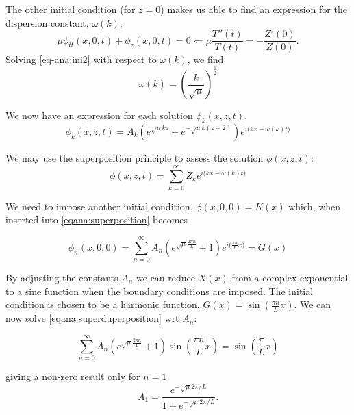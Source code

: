 \documentclass[11pt]{article}
\begin{document}
The other initial condition (for $z=0$) makes us able to find an expression for the dispersion constant, $\omega(k)$,
\begin{equation}
\mu \phi_{tt}(x,0,t) + \phi_{z}(x,0,t) = 0 \Longleftarrow \mu \frac{T''(t)}{T(t)} = - \frac{Z'(0)}{Z(0)}.
\label{eq-ana:ini2}
\end{equation}
Solving \eqref{eq-ana:ini2} with respect to $\omega(k)$, we find
\begin{equation*}
\omega(k) = \left( \frac{k}{\sqrt{\mu}} \right)^{\frac{1}{2}}
\end{equation*}

We now have an expression for each solution $\phi_k(x,z,t)$,
\begin{equation*}
\phi_k(x,z,t) = A_k \left( e^{\sqrt{\mu}kz} + e^{-\sqrt{\mu}k(z+2)} \right) e^{i\big( kx - \omega(k)t \big)}
\end{equation*}

We may use the superposition principle to assess the solution $\phi(x,z,t)$:
\begin{equation}
\label{eqana:superposition}
\phi(x,z,t) = \sum_{k=0}^{\infty} Z_k e^{i\big(kx - \omega(k) t \big)}
\end{equation}

We need to impose another initial condition, $\phi(x,0,0) = K(x)$ which, when inserted into \ref{eqana:superposition} becomes

\begin{equation}
\phi_n(x,0,0) = \sum_{n=0}^{\infty} A_n \left( e^{\sqrt{\mu}\frac{2 \pi n}{L}} + 1 \right) e^{ i \big( \frac{\pi n}{L}x \big) } = G(x)
\label{eqana:superduperposition}
\end{equation}

By adjusting the constants $A_n$ we can reduce $X(x)$ from a complex exponential to a sine function when the boundary conditions are imposed. The initial condition is chosen to be a harmonic function, $G(x) = \sin \left(\frac{\pi n}{L}x \right)$. We can now solve \ref{eqana:superduperposition} wrt $A_n$:

\begin{equation*}
\sum_{n=0}^{\infty} A_n \left( e^{\sqrt{\mu}\frac{2 \pi n}{L}} + 1 \right) \sin \left(\frac{\pi n}{L}x \right) = \sin \left( \frac{\pi }{L}x \right)
\end{equation*}

giving a non-zero result only for $n=1$
\begin{equation*}
A_1 = \frac{e^{- \sqrt{\mu}2\pi  /L } }{1 + e^{- \sqrt{\mu} 2\pi /L}}.
\end{equation*}
\end{document}

